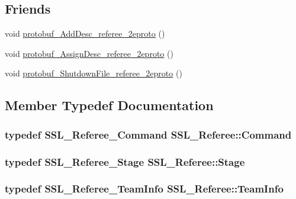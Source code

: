 \subsection*{Friends}
\begin{DoxyCompactItemize}
\item 
void \hyperlink{class_s_s_l___referee_ac6da2c479aea3c420dd2227d81752594}{protobuf\-\_\-\-Add\-Desc\-\_\-referee\-\_\-2eproto} ()
\item 
void \hyperlink{class_s_s_l___referee_a0625f3a9e112e1c97492fb70ed4b2528}{protobuf\-\_\-\-Assign\-Desc\-\_\-referee\-\_\-2eproto} ()
\item 
void \hyperlink{class_s_s_l___referee_a829b15253788b95c3a0ff8c4358647d0}{protobuf\-\_\-\-Shutdown\-File\-\_\-referee\-\_\-2eproto} ()
\end{DoxyCompactItemize}


\subsection{Member Typedef Documentation}
\hypertarget{class_s_s_l___referee_a5fc40f6f22c27ff90b91191567e36735}{
\subsubsection[{Command}]{\setlength{\rightskip}{0pt plus 5cm}typedef {\bf S\-S\-L\-\_\-\-Referee\-\_\-\-Command} {\bf S\-S\-L\-\_\-\-Referee\-::\-Command}}}\label{class_s_s_l___referee_a5fc40f6f22c27ff90b91191567e36735}
\hypertarget{class_s_s_l___referee_a59972df3405e56094caef252c884c080}{
\subsubsection[{Stage}]{\setlength{\rightskip}{0pt plus 5cm}typedef {\bf S\-S\-L\-\_\-\-Referee\-\_\-\-Stage} {\bf S\-S\-L\-\_\-\-Referee\-::\-Stage}}}\label{class_s_s_l___referee_a59972df3405e56094caef252c884c080}
\hypertarget{class_s_s_l___referee_a01148d808d7dee6dd11639203927d12d}{
\subsubsection[{Team\-Info}]{\setlength{\rightskip}{0pt plus 5cm}typedef {\bf S\-S\-L\-\_\-\-Referee\-\_\-\-Team\-Info} {\bf S\-S\-L\-\_\-\-Referee\-::\-Team\-Info}}}\label{class_s_s_l___referee_a01148d808d7dee6dd11639203927d12d}



